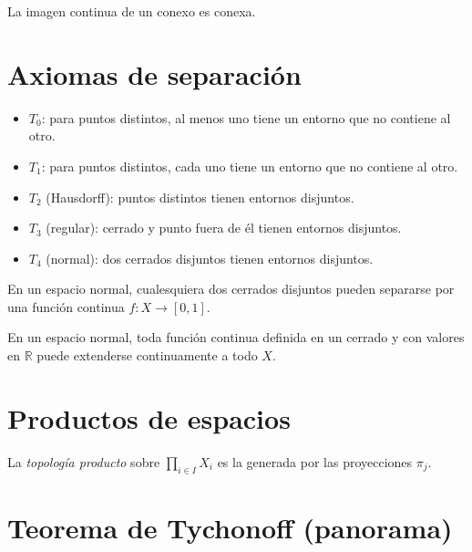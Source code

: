 \begin{proposition}
\label{prop:imagen-conexa}
La imagen continua de un conexo es conexa.
\end{proposition}

\section{Axiomas de separación}

\begin{definition}
\label{def:separacion}
\begin{itemize}
  \item $T_0$: para puntos distintos, al menos uno tiene un entorno que no contiene al otro.
  \item $T_1$: para puntos distintos, cada uno tiene un entorno que no contiene al otro.
  \item $T_2$ (Hausdorff): puntos distintos tienen entornos disjuntos.
  \item $T_3$ (regular): cerrado y punto fuera de él tienen entornos disjuntos.
  \item $T_4$ (normal): dos cerrados disjuntos tienen entornos disjuntos.
\end{itemize}
\end{definition}

\begin{theorem}[Urysohn]
\label{teo:urysohn-general}
En un espacio normal, cualesquiera dos cerrados disjuntos pueden separarse por una función continua $f\colon X\to[0,1]$.
\end{theorem}

\begin{theorem}[Tietze]
\label{teo:tietze-general}
En un espacio normal, toda función continua definida en un cerrado y con valores en $\mathbb{R}$ puede extenderse continuamente a todo $X$.
\end{theorem}

\section{Productos de espacios}

\begin{definition}
\label{def:producto-topologico}
La \emph{topología producto} sobre $\prod_{i\in I}X_i$ es la generada por las proyecciones $\pi_j$.
\end{definition}

\section{Teorema de Tychonoff (panorama)}

